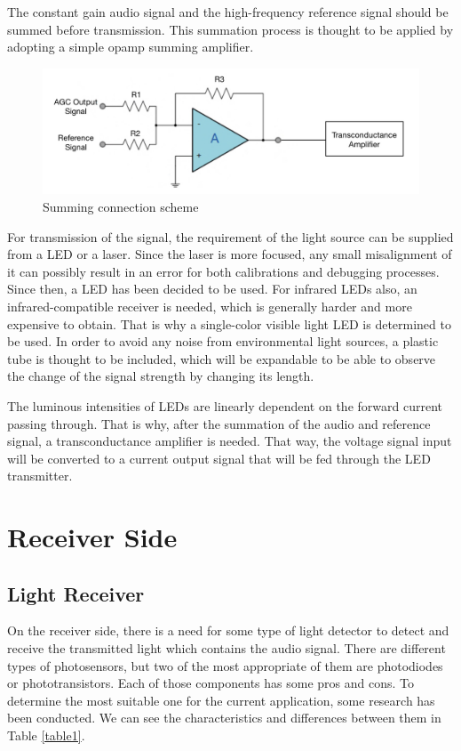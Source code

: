 \documentclass[a4paper,10pt]{IEEEtran}
\begin{document}
The constant gain audio signal and the high-frequency reference signal should be summed before transmission. This summation process is thought to be applied by adopting a simple opamp summing amplifier.     
\begin{figure}[htbp!]
    \centering
    \includegraphics[width = 1\linewidth]{transconductance.jpeg}
    \caption{Summing connection scheme }
\end{figure} 
For transmission of the signal, the requirement of the light source can be supplied from a LED or a laser. Since the laser is more focused, any small misalignment of it can possibly result in an error for both calibrations and debugging processes. Since then, a LED has been decided to be used. For infrared LEDs also, an infrared-compatible receiver is needed, which is generally harder and more expensive to obtain. That is why a single-color visible light LED is determined to be used. In order to avoid any noise from environmental light sources, a plastic tube is thought to be included, which will be expandable to be able to observe the change of the signal strength by changing its length. 

The luminous intensities of LEDs are linearly dependent on the forward current passing through. That is why, after the summation of the audio and reference signal, a transconductance amplifier is needed. That way, the voltage signal input will be converted to a current output signal that will be fed through the LED transmitter.
\vspace{-0.45cm}
\section{Receiver Side}
\vspace{-0.1cm}
\subsection{Light Receiver}

On the receiver side, there is a need for some type of light detector to detect and receive the transmitted light which contains the audio signal. There are different types of photosensors, but two of the most appropriate of them are photodiodes or phototransistors. Each of those components has some pros and cons. To determine the most suitable one for the current application, some research has been conducted. We can see the characteristics and differences between them in Table \ref*{table1}. 
\end{document}
